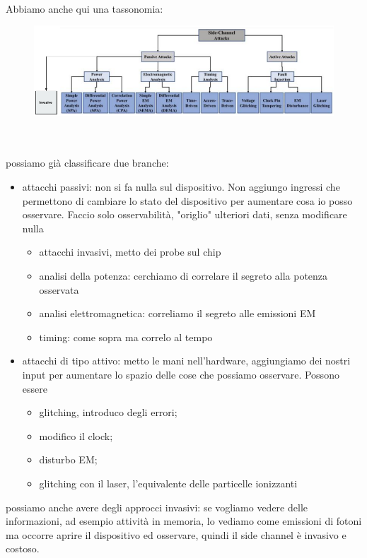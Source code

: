 \documentclass[oneside, 12pt]{extbook}
\begin{document}
\\Abbiamo anche qui una tassonomia:\\
\begin{figure}[!h]
	\includegraphics[scale=0.4]{immagini/hardware/hw_vuln_taxo.png}
\end{figure}
\\\\possiamo già classificare due branche:
\begin{itemize}
	\item attacchi passivi: non si fa nulla sul dispositivo. Non aggiungo ingressi che permettono di cambiare lo stato del dispositivo per aumentare cosa io posso osservare. Faccio solo osservabilità, "origlio" ulteriori dati, senza modificare nulla
	\begin{itemize}
		\item attacchi invasivi, metto dei probe sul chip
		\item analisi della potenza: cerchiamo di correlare il segreto alla potenza osservata
		\item analisi elettromagnetica: correliamo il segreto alle emissioni EM
		\item timing: come sopra ma correlo al tempo
	\end{itemize}
	\item attacchi di tipo attivo: metto le mani nell'hardware, aggiungiamo dei nostri input per aumentare lo spazio delle cose che possiamo osservare. Possono essere
	\begin{itemize}
		\item glitching, introduco degli errori;
		\item modifico il clock;
		\item disturbo EM;
		\item glitching con il laser, l'equivalente delle particelle ionizzanti
	\end{itemize}
\end{itemize}
possiamo anche avere degli approcci invasivi: se vogliamo vedere delle informazioni, ad esempio attività in memoria, lo vediamo come emissioni di fotoni ma occorre aprire il dispositivo ed osservare, quindi il side channel è invasivo e costoso.
\end{document}
